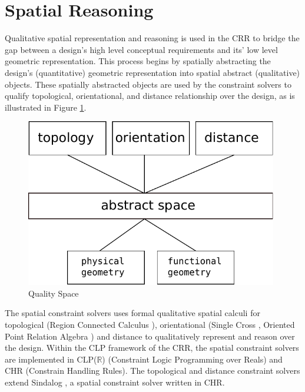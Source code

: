 \documentclass[12pt]{ucthesis}
\begin{document}
\section{Spatial Reasoning}
Qualitative spatial representation and reasoning is used in the CRR to bridge the gap between a design's high level conceptual requirements and its' low level geometric representation. This process begins by spatially abstracting the design's (quantitative) geometric representation into spatial abstract (qualitative) objects. These spatially abstracted objects are used by the constraint solvers to qualify topological, orientational, and distance relationship over the design, as is illustrated in Figure \ref{reasoner-design}. 

\begin{figure}[H]
\centering
\includegraphics[width=110mm]{reasoner-design}
\caption{Quality Space}
\label{reasoner-design}
\end{figure}

The spatial constraint solvers uses formal qualitative spatial calculi for topological (Region Connected Calculus \cite{Freksa}), orientational (Single Cross \cite{Freksa}, Oriented Point Relation Algebra \cite{Moratz}) and distance to qualitatively represent and reason over the design. Within the CLP framework of the CRR, the spatial constraint solvers are implemented in CLP($\mathbb{R}$) (Constraint Logic Programming over Reals) and CHR (Constrain Handling Rules). The topological and distance constraint solvers extend Sindalog \cite{Sindalog}, a spatial constraint solver written in CHR.
\end{document}

